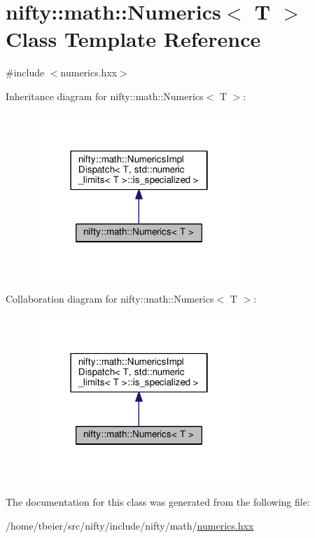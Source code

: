 \hypertarget{classnifty_1_1math_1_1Numerics}{}\section{nifty\+:\+:math\+:\+:Numerics$<$ T $>$ Class Template Reference}
\label{classnifty_1_1math_1_1Numerics}


{\ttfamily \#include $<$numerics.\+hxx$>$}



Inheritance diagram for nifty\+:\+:math\+:\+:Numerics$<$ T $>$\+:\nopagebreak
\begin{figure}[H]
\begin{center}
\leavevmode
\includegraphics[width=226pt]{classnifty_1_1math_1_1Numerics__inherit__graph}
\end{center}
\end{figure}


Collaboration diagram for nifty\+:\+:math\+:\+:Numerics$<$ T $>$\+:\nopagebreak
\begin{figure}[H]
\begin{center}
\leavevmode
\includegraphics[width=226pt]{classnifty_1_1math_1_1Numerics__coll__graph}
\end{center}
\end{figure}


The documentation for this class was generated from the following file\+:\begin{DoxyCompactItemize}
\item 
/home/tbeier/src/nifty/include/nifty/math/\hyperlink{numerics_8hxx}{numerics.\+hxx}\end{DoxyCompactItemize}
